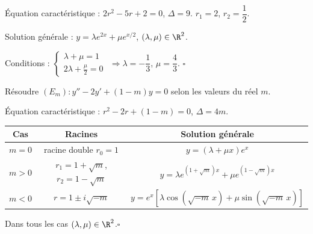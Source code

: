 \begin{Correction}
\'Equation caract\'eristique : $2r^2-5r+2=0$, $\Delta=9$.
$r_1=2$, $r_2=\dfrac{1}{2}$.

Solution g\'en\'erale : $y=\lambda e^{2x}+\mu e^{x/2}$, $(\lambda,\mu)\in\R^2$.

Conditions : $\begin{cases}\lambda+\mu=1\\2\lambda+\frac{\mu}{2}=0\end{cases}$
$\Rightarrow \lambda=-\dfrac{1}{3}$, $\mu=\dfrac{4}{3}$.
\hfill$\square$
\end{Correction}

\begin{ExoResolu}
R\'esoudre $(E_m):y''-2y'+(1-m)y=0$ selon les valeurs du r\'eel $m$.
\end{ExoResolu}

\begin{Correction}
\'Equation caract\'eristique : $r^2-2r+(1-m)=0$, $\Delta=4m$.

\begin{center}
\renewcommand{\arraystretch}{1.7}
\begin{tabular}{|c|c|c|}
\hline
\y \textbf{Cas} & \y \textbf{Racines} & \y \textbf{Solution g\'en\'erale} \\
\hline
$m=0$ & racine double $r_0=1$ & $y=(\lambda+\mu x)e^x$ \\
\hline
$m>0$ & $r_1=1+\sqrt{m}$, $r_2=1-\sqrt{m}$ & $y=\lambda e^{(1+\sqrt{m})x}+\mu e^{(1-\sqrt{m})x}$ \\
\hline
$m<0$ & $r=1\pm i\sqrt{-m}$ & $y=e^x[\lambda\cos(\sqrt{-m}\,x)+\mu\sin(\sqrt{-m}\,x)]$ \\
\hline
\end{tabular}
\end{center}

Dans tous les cas $(\lambda,\mu)\in\R^2$.\hfill$\square$
\end{Correction}
